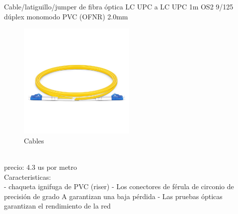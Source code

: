         Cable/latiguillo/jumper de fibra óptica LC UPC a LC UPC 1m OS2 9/125 dúplex monomodo PVC (OFNR) 2.0mm
        \begin{figure}[htb]
            \centering
            \includegraphics[width=0.5\textwidth]{assets/cableA.png}
            \caption{Cables}
            \label{fig:modelo}
            \end{figure}
            \label{sec:Background} \\

            precio: 4.3 us por metro \\

            Caracteristicas: \\
            
            - chaqueta ignifuga de PVC (riser)
            - Los conectores de férula de circonio de precisión de grado A garantizan una baja pérdida
            - Las pruebas ópticas garantizan el rendimiento de la red\\


